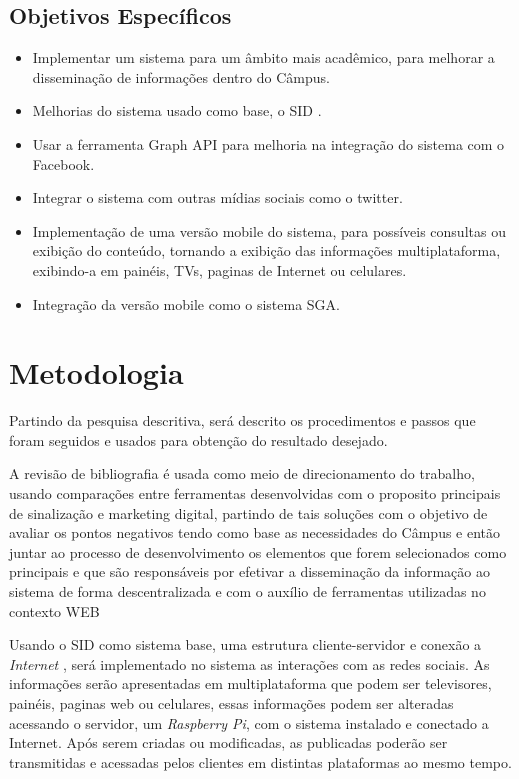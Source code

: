\documentclass[
	12pt,				%
	openright,			%
	oneside,			%
	a4paper,			%
	english,			%
	french,				%
	spanish,			%
	brazil,				%
	]{abntex2}
\begin{document}
\subsection*{Objetivos Específicos}
	 \begin{itemize}
	\item Implementar um sistema para um âmbito mais acadêmico, para melhorar a disseminação de informações dentro do Câmpus.
	 	
	\item Melhorias do sistema usado como base, o SID \cite{sobrinho2017}.
	
	\item Usar a ferramenta Graph API para melhoria na integração do sistema com o Facebook.
	
	\item Integrar o sistema com outras mídias sociais como o twitter.
	
	\item Implementação de uma versão mobile do sistema, para possíveis consultas ou exibição do conteúdo, tornando a exibição das informações multiplataforma, exibindo-a em painéis, TVs, paginas de Internet ou celulares.
	
	\item  Integração da versão mobile como o sistema SGA.
	\end{itemize}
\section*{Metodologia}
	Partindo da pesquisa descritiva, será descrito os procedimentos e passos que foram seguidos e usados para obtenção do resultado desejado.
	
	A revisão de bibliografia é usada como meio de direcionamento do trabalho, usando comparações entre ferramentas desenvolvidas com o proposito principais de sinalização e marketing digital, partindo de tais soluções com o objetivo de avaliar os pontos negativos tendo como base as necessidades do Câmpus e então juntar ao processo de desenvolvimento os elementos que forem selecionados como principais e que são responsáveis por efetivar a disseminação da informação ao sistema de forma descentralizada e com o auxílio de ferramentas utilizadas no contexto WEB
	 
	Usando o SID como sistema base, uma estrutura cliente-servidor e conexão a \textit{Internet} , será implementado no sistema as interações com as redes sociais. As informações serão apresentadas em multiplataforma que podem ser televisores, painéis, paginas web ou celulares, essas informações podem ser alteradas acessando o servidor, um \textit{Raspberry Pi}, com o sistema instalado e conectado a Internet. Após serem criadas ou modificadas, as publicadas poderão ser transmitidas e acessadas pelos clientes em distintas plataformas ao mesmo tempo.
	
\end{document}
